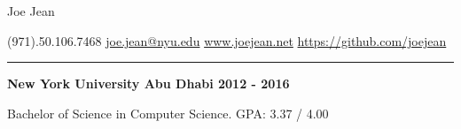 \documentclass[11pt]{article} %
\begin{document}
\centerline{{\Huge \sc Joe Jean}}  %
\centerline{(971).50.106.7468 \textbar \hspace{2pt}\href{mailto:joe.jean@nyu.edu}{joe.jean@nyu.edu} \textbar \hspace{2pt}\url{www.joejean.net} \textbar \hspace{2pt}\url{https://github.com/joejean} } 
\noindent
\rule{\textwidth}{1pt}\bigskip

\medskip

\noindent \centerline{\normalsize \bf New York University Abu Dhabi \hfill \textbf{2012 - 2016}}
Bachelor of Science in Computer Science. GPA: 3.37 / 4.00\\

 \medskip
\end{document}
